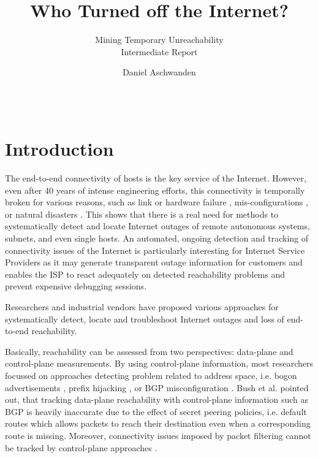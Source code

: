 \documentclass{sigcomm-alternate}
\begin{document}
 
\title{Who Turned off the Internet?} 
\subtitle{Mining Temporary Unreachability\\ \Large Intermediate Report }

\author{ \alignauthor Daniel Aschwanden\\
\\
\\
}

\maketitle 
\section{Introduction}
The end-to-end connectivity of hosts is the key service of the Internet.
However, even after 40 years of intense engineering efforts, this
connectivity is temporally broken for various reasons, such as link
or hardware failure \cite{Markopoulou:2008}, mis-configurations
\cite{Mahajan:2002}, or natural disasters
\cite{Dainotti:2012:EBH,Schulman:2011}.
This shows that there is a real need for methods to systematically
detect and locate Internet outages of remote autonomous systems,
subnets, and even single hosts. An automated, ongoing detection and
tracking of connectivity issues of the Internet is particularly
interesting for Internet Service Providers as it may generate
transparent outage information for customers and enables the ISP
to react adequately on detected reachability problems and prevent
expensive debugging sessions.

Researchers and industrial vendors have proposed various approaches
for systematically detect, locate and troubleshoot Internet outages
and loss of end-to-end reachability.

Basically, reachability can be assessed from two perspectives:
data-plane and control-plane measurements. By using control-plane
information, most researchers focussed on approaches detecting
problem related to address space, i.e. bogon advertisements
\cite{Feamster:2005}, prefix hijacking \cite{Zhang:2010},
or BGP misconfiguration \cite{Mahajan:2002}. Bush et
al.\cite{Bush:Optometry} pointed out, that tracking data-plane
reachability with control-plane information such as BGP is heavily
inaccurate due to the effect of secret peering policies, i.e. default
routes which allows packets to reach their destination even when a
corresponding route is missing.
Moreover, connectivity issues imposed by packet filtering cannot
be tracked by control-plane approaches \cite{Dainotti:2011:ACI}.
\end{document}
